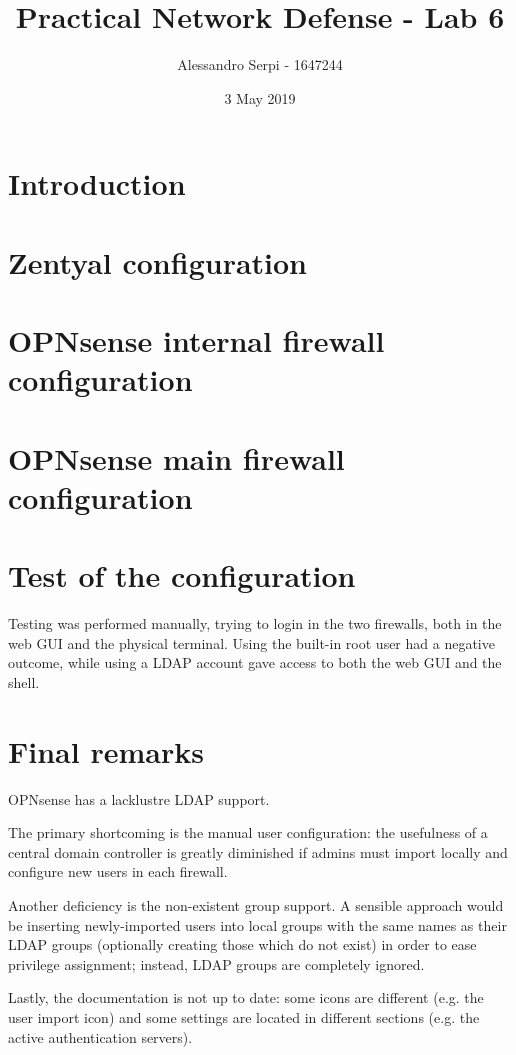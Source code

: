 \documentclass[draft]{homework}
\title{Practical Network Defense - Lab 6}
\author{Alessandro Serpi - 1647244}
\date{3 May 2019}
\newcommand{\opn}{OPNsense\xspace}
\begin{document}
    \maketitle
    \tableofcontents
    
    
    \pagebreak
    \section{Introduction}
    
    
    \section{Zentyal configuration}
    
    
    \section{\opn internal firewall configuration}
    
    
    \section{\opn main firewall configuration}
    
    
    \section{Test of the configuration}
    Testing was performed manually, trying to login in the two firewalls, both in the web GUI and the physical terminal.
    Using the built-in root user had a negative outcome, while using a LDAP account gave access to both the web GUI and the shell.
    
    
    \section{Final remarks}
    \opn has a lacklustre LDAP support.
    
    The primary shortcoming is the manual user configuration: the usefulness of a central domain controller is greatly diminished if admins must import locally and configure new users in each firewall.
    
    Another deficiency is the non-existent group support.
    A sensible approach would be inserting newly-imported users into local groups with the same names as their LDAP groups (optionally creating those which do not exist) in order to ease privilege assignment; instead, LDAP groups are completely ignored.
    
    Lastly, the documentation is not up to date: some icons are different (e.g. the user import icon) and some settings are located in different sections (e.g. the active authentication servers).
\end{document}
